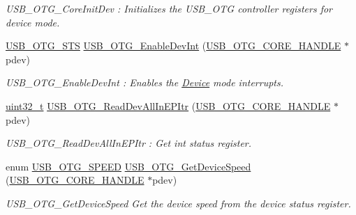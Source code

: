 \begin{DoxyCompactItemize}
\begin{DoxyCompactList}\small\item\em U\-S\-B\-\_\-\-O\-T\-G\-\_\-\-Core\-Init\-Dev \-: Initializes the U\-S\-B\-\_\-\-O\-T\-G controller registers for device mode. \end{DoxyCompactList}\item 
\hyperlink{group___u_s_b___c_o_r_e___exported___types_ga8b6504b9af0662f17515795db0f9c8ed}{U\-S\-B\-\_\-\-O\-T\-G\-\_\-\-S\-T\-S} \hyperlink{group___u_s_b___c_o_r_e___exported___functions_prototype_ga2959c9873c31cfc79f90ec16314360f0}{U\-S\-B\-\_\-\-O\-T\-G\-\_\-\-Enable\-Dev\-Int} (\hyperlink{group___u_s_b___c_o_r_e___exported___types_gaf76054c11eb8a3367907aad7ae700e80}{U\-S\-B\-\_\-\-O\-T\-G\-\_\-\-C\-O\-R\-E\-\_\-\-H\-A\-N\-D\-L\-E} $\ast$pdev)
\begin{DoxyCompactList}\small\item\em U\-S\-B\-\_\-\-O\-T\-G\-\_\-\-Enable\-Dev\-Int \-: Enables the \hyperlink{struct_device}{Device} mode interrupts. \end{DoxyCompactList}\item 
\hyperlink{stdint_8h_a435d1572bf3f880d55459d9805097f62}{uint32\-\_\-t} \hyperlink{group___u_s_b___c_o_r_e___exported___functions_prototype_ga53415c92edbfe07ff54c0e6f5241f8c9}{U\-S\-B\-\_\-\-O\-T\-G\-\_\-\-Read\-Dev\-All\-In\-E\-P\-Itr} (\hyperlink{group___u_s_b___c_o_r_e___exported___types_gaf76054c11eb8a3367907aad7ae700e80}{U\-S\-B\-\_\-\-O\-T\-G\-\_\-\-C\-O\-R\-E\-\_\-\-H\-A\-N\-D\-L\-E} $\ast$pdev)
\begin{DoxyCompactList}\small\item\em U\-S\-B\-\_\-\-O\-T\-G\-\_\-\-Read\-Dev\-All\-In\-E\-P\-Itr \-: Get int status register. \end{DoxyCompactList}\item 
enum \hyperlink{group___internal___macro_ga5cb546411f61c7a89e7e9e2b7baf9296}{U\-S\-B\-\_\-\-O\-T\-G\-\_\-\-S\-P\-E\-E\-D} \hyperlink{group___u_s_b___c_o_r_e___exported___functions_prototype_ga3e4675bb60bcdeba67e1ad120c8186f1}{U\-S\-B\-\_\-\-O\-T\-G\-\_\-\-Get\-Device\-Speed} (\hyperlink{group___u_s_b___c_o_r_e___exported___types_gaf76054c11eb8a3367907aad7ae700e80}{U\-S\-B\-\_\-\-O\-T\-G\-\_\-\-C\-O\-R\-E\-\_\-\-H\-A\-N\-D\-L\-E} $\ast$pdev)
\begin{DoxyCompactList}\small\item\em U\-S\-B\-\_\-\-O\-T\-G\-\_\-\-Get\-Device\-Speed Get the device speed from the device status register. \end{DoxyCompactList}\item 

\end{DoxyCompactItemize}
